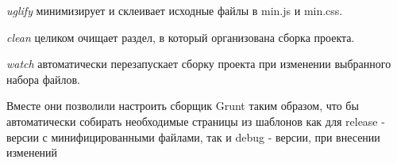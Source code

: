 \textit{uglify} минимизирует и склеивает исходные файлы в min.js и min.css.

\textit{clean} целиком очищает раздел, в который организована сборка проекта.

\textit{watch} автоматически перезапускает сборку проекта при изменении выбранного набора файлов.


Вместе они позволили настроить сборщик Grunt таким образом, что бы автоматически собирать необходимые страницы из шаблонов как для release - версии с минифицированными файлами, так и debug - версии, при внесении изменений

\clearpage
